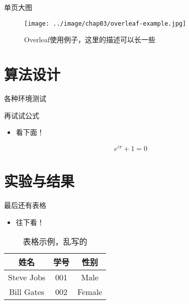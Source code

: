 \documentclass{sysupptthesis}
\begin{document}
\begin{frame}{单页大图}

    \begin{figure}
        \texttt{[image: ../image/chap03/overleaf-example.jpg]}
        \caption{Overleaf使用例子，这里的描述可以长一些}
        \label{fig:overleaf-example}
    \end{figure}

\end{frame}

\section{算法设计}

\begin{frame}[allowframebreaks]{各种环境测试}




    \begin{block}{再试试公式}
        \begin{itemize}
            \item 看下面！
        \end{itemize}
    \end{block}

    \begin{equation}
        e^{i\pi}+1=0
    \end{equation}

\end{frame}

\section{实验与结果}

\begin{frame}

    \begin{block}{最后还有表格}
        \begin{itemize}
            \item 往下看！
        \end{itemize}
    \end{block}

    \begin{table}
        \begin{tabular}{ccc}
            \hline
            姓名       & 学号 & 性别   \\
            \hline
            Steve Jobs & 001  & Male   \\
            Bill Gates & 002  & Female \\
            \hline
        \end{tabular}
        \caption{表格示例，乱写的}
        \label{fig:table-example}
    \end{table}

\end{frame}
\end{document}
